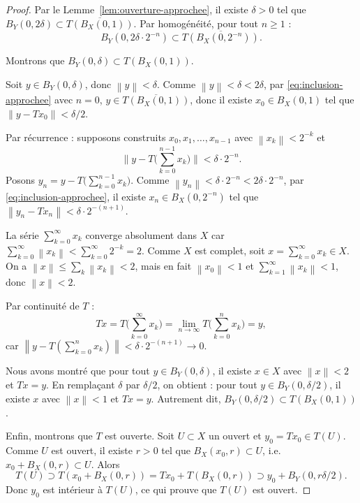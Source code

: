 \documentclass[a4paper,12pt]{book}
\newcommand{\norm}[1]{\left\| #1 \right\|}
\theoremstyle{definition}
\theoremstyle{plain}
\theoremstyle{remark}
\begin{document}
\begin{proof}
Par le Lemme~\ref{lem:ouverture-approchee}, il existe $\delta > 0$ tel que
$B_Y(0, 2\delta) \subset \overline{T(B_X(0,1))}$. Par homogénéité, pour tout
$n \geq 1$ :
\begin{equation}
\label{eq:inclusion-approchee}
  B_Y(0, 2\delta \cdot 2^{-n}) \subset \overline{T(B_X(0, 2^{-n}))}.
\end{equation}

Montrons que $B_Y(0, \delta) \subset T(B_X(0,1))$.

Soit $y \in B_Y(0, \delta)$, donc $\norm{y} < \delta$.
Comme $\norm{y} < \delta < 2\delta$, par \eqref{eq:inclusion-approchee} avec $n=0$,
$y \in \overline{T(B_X(0,1))}$, donc il existe $x_0 \in B_X(0, 1)$ tel que
$\norm{y - Tx_0} < \delta/2$.

Par récurrence : supposons construits $x_0, x_1, \ldots, x_{n-1}$ avec
$\norm{x_k} < 2^{-k}$ et
\[
  \biggl\| y - T\biggl(\sum_{k=0}^{n-1} x_k\biggr) \biggr\| < \delta \cdot 2^{-n}.
\]
Posons $y_n = y - T\bigl(\sum_{k=0}^{n-1} x_k\bigr)$. Comme $\norm{y_n} < \delta \cdot 2^{-n}
< 2\delta \cdot 2^{-n}$, par \eqref{eq:inclusion-approchee}, il existe
$x_n \in B_X(0, 2^{-n})$ tel que $\norm{y_n - Tx_n} < \delta \cdot 2^{-(n+1)}$.

La série $\sum_{k=0}^{\infty} x_k$ converge absolument dans $X$ car
$\sum_{k=0}^{\infty} \norm{x_k} < \sum_{k=0}^{\infty} 2^{-k} = 2$.
Comme $X$ est complet, soit $x = \sum_{k=0}^{\infty} x_k \in X$.
On a $\norm{x} \leq \sum_k \norm{x_k} < 2$, mais en fait
$\norm{x_0} < 1$ et $\sum_{k=1}^{\infty} \norm{x_k} < 1$, donc $\norm{x} < 2$.

Par continuité de $T$ :
\[
  Tx = T\biggl(\sum_{k=0}^{\infty} x_k\biggr)
  = \lim_{n \to \infty} T\biggl(\sum_{k=0}^{n} x_k\biggr) = y,
\]
car $\norm{y - T(\sum_{k=0}^{n} x_k)} < \delta \cdot 2^{-(n+1)} \to 0$.

Nous avons montré que pour tout $y \in B_Y(0, \delta)$, il existe $x \in X$
avec $\norm{x} < 2$ et $Tx = y$. En remplaçant $\delta$ par $\delta/2$, on
obtient : pour tout $y \in B_Y(0, \delta/2)$, il existe $x$ avec $\norm{x} < 1$
et $Tx = y$. Autrement dit, $B_Y(0, \delta/2) \subset T(B_X(0,1))$.

Enfin, montrons que $T$ est ouverte. Soit $U \subset X$ un ouvert et
$y_0 = Tx_0 \in T(U)$. Comme $U$ est ouvert, il existe $r > 0$ tel que
$B_X(x_0, r) \subset U$, i.e.\ $x_0 + B_X(0,r) \subset U$. Alors
\[
  T(U) \supset T(x_0 + B_X(0,r)) = Tx_0 + T(B_X(0,r))
  \supset y_0 + B_Y(0, r\delta/2).
\]
Donc $y_0$ est intérieur à $T(U)$, ce qui prouve que $T(U)$ est ouvert.
\end{proof}
\end{document}
